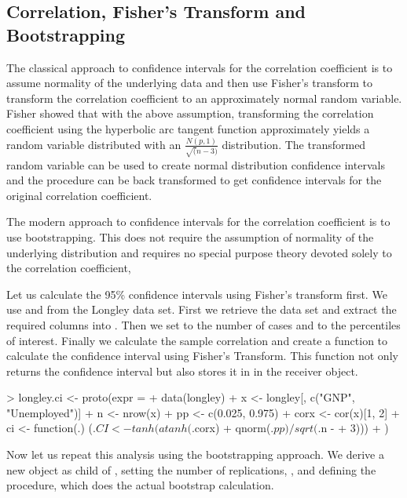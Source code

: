 \documentclass{Z}
\begin{document}
\subsection{Correlation, Fisher's Transform and Bootstrapping}

The classical approach to 
confidence intervals for the correlation coefficient is to
assume normality of the underlying data and then use Fisher's transform
to transform the correlation coefficient to an approximately normal
random variable.
Fisher showed that with the above assumption, transforming 
the correlation coefficient using
the hyperbolic arc tangent function approximately
yields a random variable
distributed with an
$\frac{N(p, 1)}{\sqrt(n-3)}$ distribution.  The transformed random
variable can be used to create normal distribution confidence intervals
and the procedure can be back transformed to get confidence intervals
for the original correlation coefficient.

The modern approach to confidence intervals for the correlation
coefficient is to use bootstrapping.  This does not require the
assumption of normality of the underlying distribution and requires
no special purpose theory devoted solely to the correlation coefficient,

Let us calculate the 95\% 
confidence intervals using Fisher's transform
first.  We use  and  from the Longley data
set.  First we retrieve the data set and extract the required columns
into .  Then we set  to the number of cases
and  to the percentiles
of interest.  Finally we calculate the sample correlation and
create a function to calculate the confidence interval using 
Fisher's Transform.  This function not only returns the confidence
interval but also stores it in  in the receiver object.

\begin{Schunk}
\begin{Sinput}
> longley.ci <- proto(expr = {
+     data(longley)
+     x <- longley[, c("GNP", "Unemployed")]
+     n <- nrow(x)
+     pp <- c(0.025, 0.975)
+     corx <- cor(x)[1, 2]
+     ci <- function(.) (.$CI <- tanh(atanh(.$corx) + qnorm(.$pp)/sqrt(.$n - 
+         3)))
+ })
\end{Sinput}
\end{Schunk}

Now let us repeat this analysis using the bootstrapping approach.  We
derive a new object  as child of
, setting the number of replications, , and
defining the procedure,  which does the actual bootstrap
calculation.
\end{document}
